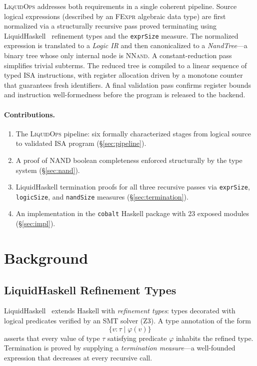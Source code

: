 \documentclass[sigconf,natbib=false]{acmart}
\begin{document}
\textsc{LiquidOps} addresses both requirements in a single coherent pipeline.
Source logical expressions (described by an \textsc{FExpr} algebraic data type)
are first normalized via a structurally recursive pass proved terminating using
LiquidHaskell~\cite{vazou2014lh} refinement types and the \texttt{exprSize}
measure. The normalized expression is translated to a \emph{Logic IR} and then
canonicalized to a \emph{NandTree}---a binary tree whose only internal node is
\textsc{NNand}. A constant-reduction pass simplifies trivial subterms.
The reduced tree is compiled to a linear sequence of typed ISA instructions,
with register allocation driven by a monotone counter that guarantees fresh
identifiers. A final validation pass confirms register bounds and instruction
well-formedness before the program is released to the backend.

\paragraph{Contributions.}
\begin{enumerate}
  \item The \textsc{LiquidOps} pipeline: six formally characterized stages from
    logical source to validated ISA program (\S\ref{sec:pipeline}).
  \item A proof of NAND boolean completeness enforced structurally by the type
    system (\S\ref{sec:nand}).
  \item LiquidHaskell termination proofs for all three recursive passes via
    \texttt{exprSize}, \texttt{logicSize}, and \texttt{nandSize} measures
    (\S\ref{sec:termination}).
  \item An implementation in the \texttt{cobalt} Haskell package with 23
    exposed modules (\S\ref{sec:impl}).
\end{enumerate}


\section{Background}

\subsection{LiquidHaskell Refinement Types}

LiquidHaskell~\cite{vazou2014lh,rondon2008liqtypes} extends Haskell with
\emph{refinement types}: types decorated with logical predicates verified by an
SMT solver (Z3). A type annotation of the form
\[
  \{v : \tau \mid \varphi(v)\}
\]
asserts that every value of type $\tau$ satisfying predicate $\varphi$ inhabits
the refined type. Termination is proved by supplying a \emph{termination
measure}---a well-founded expression that decreases at every recursive call.
\end{document}
